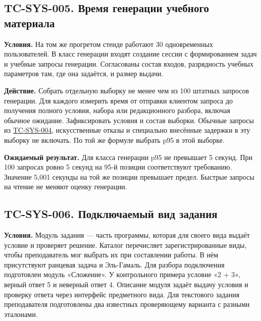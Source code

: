 \documentclass[12pt,a4paper]{article}
\begin{document}
\subsection{TC-SYS-005. Время генерации учебного материала}\label{tc-sys-005-ux432ux440ux435ux43cux44f-ux433ux435ux43dux435ux440ux430ux446ux438ux438-ux443ux447ux435ux431ux43dux43eux433ux43e-ux43cux430ux442ux435ux440ux438ux430ux43bux430}

\hypertarget{tc-sys-005-время-генерации-учебного-материала}{}

\hypertarget{tc-sys-005}{}

\textbf{Условия.} На том же прогретом стенде работают 30 одновременных пользователей. В класс генерации входят создание сессии с формированием задач и учебные запросы генерации. Согласованы состав входов, разрядность учебных параметров там, где она задаётся, и размер выдачи.

\textbf{Действие.} Собрать отдельную выборку не менее чем из 100 штатных запросов генерации. Для каждого измерить время от отправки клиентом запроса до получения полного условия, набора или редакционного разбора, включая обычное ожидание. Зафиксировать условия и состав выборки. Обычные запросы из {\hyperlink{tc-sys-004}{TC-SYS-004}}, искусственные отказы и специально внесённые задержки в эту выборку не включать. По той же формуле выбрать p95 в этой выборке.

\textbf{Ожидаемый результат.} Для класса генерации p95 не превышает 5 секунд. При 100 запросах ровно 5 секунд на 95-й позиции соответствуют требованию. Значение 5,001 секунды на той же позиции превышает предел. Быстрые запросы на чтение не меняют оценку генерации.

\subsection{TC-SYS-006. Подключаемый вид задания}\label{tc-sys-006-ux43fux43eux434ux43aux43bux44eux447ux430ux435ux43cux44bux439-ux432ux438ux434-ux437ux430ux434ux430ux43dux438ux44f}

\hypertarget{tc-sys-006-подключаемый-вид-задания}{}

\hypertarget{tc-sys-006}{}

\textbf{Условия.} Модуль задания --- часть программы, которая для своего вида выдаёт условие и проверяет решение. Каталог перечисляет зарегистрированные виды, чтобы преподаватель мог выбрать их при составлении работы. В нём присутствуют ранцевая задача и Эль-Гамаль. Для разбора подключения подготовлен модуль «Сложение». У контрольного примера условие «2 + 3», верный ответ 5 и неверный ответ 4. Описание модуля задаёт выдачу условия и проверку ответа через интерфейс предметного вида. Для текстового задания преподавателя подготовлены два известных проверяющему варианта с разными эталонами.
\end{document}
